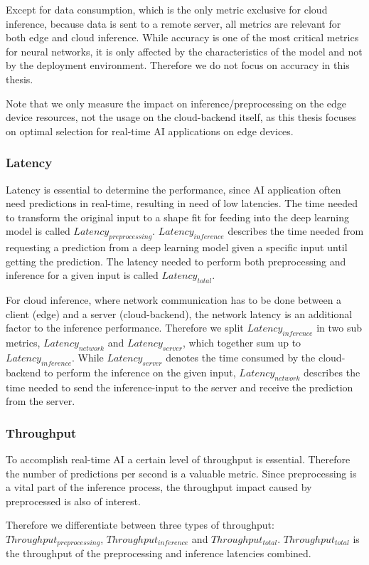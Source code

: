 Except for data consumption, which is the only metric exclusive for cloud inference, because data is sent to a remote server, all metrics are relevant for both edge and cloud inference.
While accuracy is one of the most critical metrics for neural networks, it is only affected by the characteristics of the model and not by the deployment environment. Therefore we do not focus on accuracy in this thesis.

Note that we only measure the impact on inference/preprocessing on the edge device resources, not the usage on the cloud-backend itself, as this thesis focuses on optimal selection for real-time AI applications on edge devices.
\subsubsection{Latency}
\label{chap:latency}
Latency is essential to determine the performance, since AI application often need predictions in real-time, resulting in need of low latencies.
The time needed to transform the original input to a shape fit for feeding into the deep learning model is called $Latency_{preprocessing}$.
$Latency_{inference}$ describes the time needed from requesting a prediction from a deep learning model given a specific input until getting the prediction.
The latency needed to perform both preprocessing and inference for a given input is called $Latency_{total}$.

For cloud inference, where network communication has to be done between a client (edge) and a server (cloud-backend), the network latency is an additional factor to the inference performance.
Therefore we split $Latency_{inference}$ in two sub metrics, $Latency_{network}$ and $Latency_{server}$, which together sum up to $Latency_{inference}$.
While $Latency_{server}$ denotes the time consumed by the cloud-backend to perform the inference on the given input, $Latency_{network}$ describes the time needed to send the inference-input to the server and receive the prediction from the server.
\subsubsection{Throughput}
To accomplish real-time AI a certain level of throughput is essential. Therefore the number of predictions per second is a valuable metric. 
Since preprocessing is a vital part of the inference process, the throughput impact caused by preprocessed is also of interest.

Therefore we differentiate between three types of throughput: $Throughput_{preprocessing}$, $Throughput_{inference}$ and $Throughput_{total}$.
$Throughput_{total}$ is the throughput of the preprocessing and inference latencies combined.



